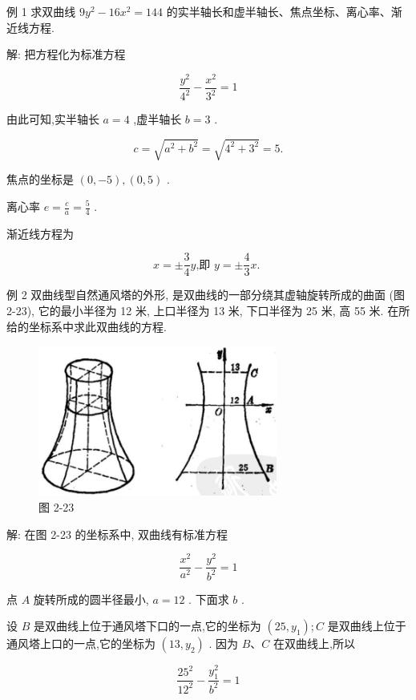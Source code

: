 \documentclass[lang=cn,newtx,10pt,scheme=chinese]{elegantbook}
\begin{document}
例 1 求双曲线 \(9{y}^{2} - {16}{x}^{2} = {144}\) 的实半轴长和虚半轴长、焦点坐标、离心率、渐近线方程.

解: 把方程化为标准方程

\[
  \frac{{y}^{2}}{{4}^{2}} - \frac{{x}^{2}}{{3}^{2}} = 1
\]

由此可知,实半轴长 \(a = 4\) ,虚半轴长 \(b = 3\) .

\[
  c = \sqrt{{a}^{2} + {b}^{2}} = \sqrt{{4}^{2} + {3}^{2}} = 5.
\]

焦点的坐标是 \(\left( {0, - 5}\right) ,\left( {0,5}\right)\) .

离心率 \(e = \frac{c}{a} = \frac{5}{4}\) .

渐近线方程为

\[
  x = \pm \frac{3}{4}y\text{,即 }y = \pm \frac{4}{3}x\text{. }
\]

例 2 双曲线型自然通风塔的外形, 是双曲线的一部分绕其虚轴旋转所成的曲面 (图 2-23), 它的最小半径为 12 米, 上口半径为 13 米, 下口半径为 25 米, 高 55 米. 在所给的坐标系中求此双曲线的方程.

\begin{figure}[h]
  \centering
  \includegraphics[max width=0.7\textwidth]{images/01912cc2-ffb6-728e-9ae7-b113ff05c64b_102_919231.jpg}
  \caption{图 2-23}
\end{figure}



解: 在图 2-23 的坐标系中, 双曲线有标准方程

\[
  \frac{{x}^{2}}{{a}^{2}} - \frac{{y}^{2}}{{b}^{2}} = 1
\]

点 \(A\) 旋转所成的圆半径最小, \(a = {12}\) . 下面求 \(b\) .

设 \(B\) 是双曲线上位于通风塔下口的一点,它的坐标为 \(\left( {{25},{y}_{1}}\right) ;C\) 是双曲线上位于通风塔上口的一点,它的坐标为 \(\left( {{13},{y}_{2}}\right)\) . 因为 \(B\text{、}C\) 在双曲线上,所以

\[
  \frac{{25}^{2}}{{12}^{2}} - \frac{{y}_{1}^{2}}{{b}^{2}} = 1
\]
\end{document}
